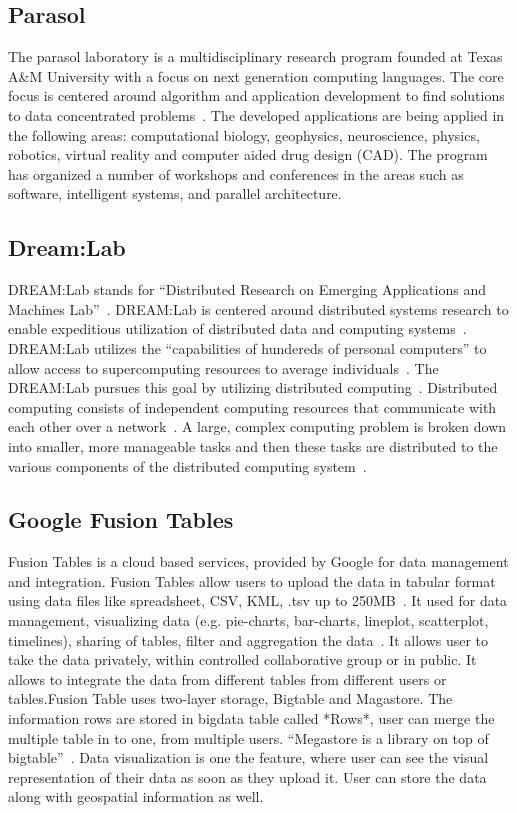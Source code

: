 \subsection{Parasol}

The parasol laboratory is a multidisciplinary research program founded
at Texas A\&M University with a focus on next generation computing
languages.  The core focus is centered around algorithm and
application development to find solutions to data concentrated
problems~\cite{www-parasol}. The developed applications are being
applied in the following areas: computational biology, geophysics,
neuroscience, physics, robotics, virtual reality and computer aided
drug design (CAD).  The program has organized a number of workshops
and conferences in the areas such as software, intelligent systems,
and parallel architecture.
    
\subsection{Dream:Lab}

DREAM:Lab stands for ``Distributed Research on Emerging Applications
and Machines Lab''~\cite{dream}. DREAM:Lab is centered around
distributed systems research to enable expeditious utilization of
distributed data and computing systems~\cite{dream}. DREAM:Lab
utilizes the ``capabilities of hundereds of personal computers'' to
allow access to supercomputing resources to average
individuals~\cite{rao}. The DREAM:Lab pursues this goal by utilizing
distributed computing~\cite{rao}.  Distributed computing consists of
independent computing resources that communicate with each other over
a network~\cite{denero}. A large, complex computing problem is broken
down into smaller, more manageable tasks and then these tasks are
distributed to the various components of the distributed computing
system~\cite{denero}.

    \pv
    
\subsection{Google Fusion Tables}
    
Fusion Tables is a cloud based services, provided by Google for data
management and integration. Fusion Tables allow users to upload the
data in tabular format using data files like spreadsheet, CSV, KML,
.tsv up to 250MB~\cite{www-FusionTableSupport}. It used for data
management, visualizing data (e.g. pie-charts, bar-charts, lineplot,
scatterplot, timelines), sharing of tables, filter and aggregation the
data~\cite{wiki-FusionTable}.  It allows user to take the data
privately, within controlled collaborative group or in public. It
allows to integrate the data from different tables from different
users or tables.Fusion Table uses two-layer storage, Bigtable and
Magastore. The information rows are stored in bigdata table called
*Rows*, user can merge the multiple table in to one, from multiple
users. ``Megastore is a library on top of
bigtable''~\cite{GoogleFusionTable2012}. Data visualization is one the
feature, where user can see the visual representation of their data as
soon as they upload it. User can store the data along with geospatial
information as well.

